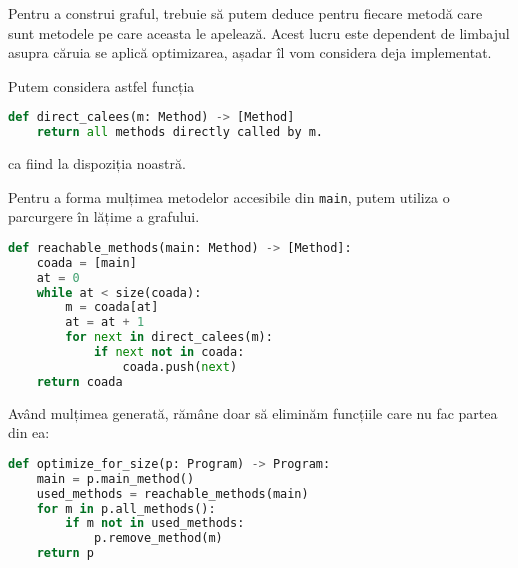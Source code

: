 Pentru a construi graful, trebuie să putem deduce pentru fiecare
metodă care sunt metodele pe care aceasta le apelează.
Acest lucru este dependent de limbajul asupra căruia se aplică
optimizarea, așadar îl vom considera deja implementat.

Putem considera astfel funcția
\begin{lstlisting}[language=Python]
def direct_calees(m: Method) -> [Method]
    return all methods directly called by m.
\end{lstlisting}
ca fiind la dispoziția noastră.

Pentru a forma mulțimea metodelor accesibile din \texttt{main},
putem utiliza o parcurgere în lățime a grafului.

\begin{lstlisting}[language=Python]
def reachable_methods(main: Method) -> [Method]:
    coada = [main]
    at = 0
    while at < size(coada):
        m = coada[at]
        at = at + 1
        for next in direct_calees(m):
            if next not in coada:
                coada.push(next)
    return coada
\end{lstlisting}

Având mulțimea generată, rămâne doar să eliminăm funcțiile
care nu fac partea din ea:

\begin{lstlisting}[language=Python]
def optimize_for_size(p: Program) -> Program:
    main = p.main_method()
    used_methods = reachable_methods(main)
    for m in p.all_methods():
        if m not in used_methods:
            p.remove_method(m)
    return p
\end{lstlisting}
